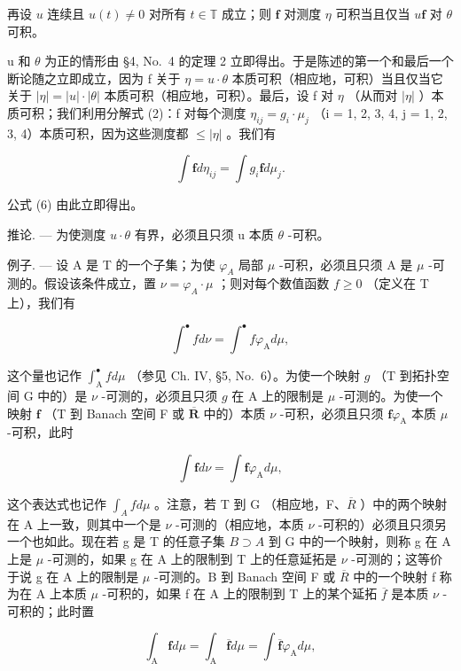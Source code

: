 再设 \(u\) 连续且 \(u(t) \neq 0\) 对所有 \(t \in \mathbb{T}\) 成立；则 \(\mathbf{f}\) 对测度 \(\eta\) 可积当且仅当 \(u\mathbf{f}\) 对 \(\theta\) 可积。

u 和 \(\theta\) 为正的情形由 §4, No.~4 的定理 2 立即得出。于是陈述的第一个和最后一个断论随之立即成立，因为 f 关于 \(\eta = u \cdot \theta\) 本质可积（相应地，可积）当且仅当它关于 \(|\eta| = |u| \cdot |\theta|\) 本质可积（相应地，可积）。最后，设 f 对 \(\eta\) （从而对 \(|\eta|\) ）本质可积；我们利用分解式 (2)：f 对每个测度 \(\eta_{ij} = g_i \cdot \mu_j\) （i = 1, 2, 3, 4, j = 1, 2, 3, 4）本质可积，因为这些测度都 \(\leqslant |\eta|\) 。我们有

\[
\int \mathbf {f} d \eta_ {i j} = \int g _ {i} \mathbf {f} d \mu_ {j}.
\]

公式 (6) 由此立即得出。

推论. --- 为使测度 \(u \cdot \theta\) 有界，必须且只须 u 本质 \(\theta\) -可积。

例子. --- 设 A 是 T 的一个子集；为使 \(\varphi_{A}\) 局部 \(\mu\) -可积，必须且只须 A 是 \(\mu\) -可测的。假设该条件成立，置 \(\nu = \varphi_{A} \cdot \mu\) ；则对每个数值函数 \(f \geqslant 0\) （定义在 T 上），我们有

\[
\int^ {\bullet} f d \nu = \int^ {\bullet} f \varphi_ {\mathrm{A}} d \mu ,
\]

这个量也记作 \(\int_{\mathrm{A}}^{\bullet}f d\mu\) （参见 Ch. IV, §5, No.~6）。为使一个映射 \(g\) （T 到拓扑空间 G 中的）是 \(\nu\) -可测的，必须且只须 \(g\) 在 A 上的限制是 \(\mu\) -可测的。为使一个映射 \(\mathbf{f}\) （T 到 Banach 空间 F 或 \(\overline{\mathbf{R}}\) 中的）本质 \(\nu\) -可积，必须且只须 \(\mathbf{f}\varphi_{\mathrm{A}}\) 本质 \(\mu\) -可积，此时

\[
\int \mathbf {f} d \nu = \int \mathbf {f} \varphi_ {\mathrm{A}} d \mu ,
\]

这个表达式也记作 \(\int_{A} f d\mu\) 。注意，若 T 到 G （相应地，F、\(\overline{R}\) ）中的两个映射在 A 上一致，则其中一个是 \(\nu\) -可测的（相应地，本质 \(\nu\) -可积的）必须且只须另一个也如此。现在若 g 是 T 的任意子集 \(B \supset A\) 到 G 中的一个映射，则称 g 在 A 上是 \(\mu\) -可测的，如果 g 在 A 上的限制到 T 上的任意延拓是 \(\nu\) -可测的；这等价于说 g 在 A 上的限制是 \(\mu\) -可测的。B 到 Banach 空间 F 或 \(\overline{R}\) 中的一个映射 f 称为在 A 上本质 \(\mu\) -可积的，如果 f 在 A 上的限制到 T 上的某个延拓 \(\overline{f}\) 是本质 \(\nu\) -可积的；此时置

\[
\int_ {\mathrm{A}} \mathbf {f} d \mu = \int_ {\mathrm{A}} \overline {{\mathbf {f}}} d \mu = \int \overline {{\mathbf {f}}} \varphi_ {\mathrm{A}} d \mu ,
\]

